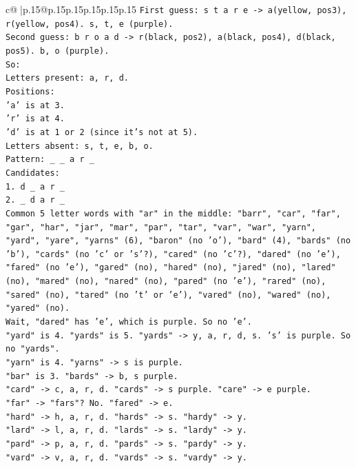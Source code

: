 \documentclass{article}
\begin{document}
{\begin{supertabular}{c@{$\;$}|p{.15\linewidth}@{}p{.15\linewidth}p{.15\linewidth}p{.15\linewidth}p{.15\linewidth}p{.15\linewidth}}
{{{\texttt{First guess: s t a r e {-}> a(yellow, pos3), r(yellow, pos4). s, t, e (purple).} \\
\texttt{Second guess: b r o a d {-}> r(black, pos2), a(black, pos4), d(black, pos5). b, o (purple).} \\
\texttt{So:} \\
\texttt{Letters present: a, r, d.} \\
\texttt{Positions:} \\
\texttt{'a' is at 3.} \\
\texttt{'r' is at 4.} \\
\texttt{'d' is at 1 or 2 (since it's not at 5).} \\
\texttt{Letters absent: s, t, e, b, o.} \\
\texttt{Pattern: \_ \_ a r \_} \\
\texttt{Candidates:} \\
\texttt{1. d \_ a r \_} \\
\texttt{2. \_ d a r \_} \\
\texttt{Common 5 letter words with "ar" in the middle: "barr", "car", "far", "gar", "har", "jar", "mar", "par", "tar", "var", "war", "yarn", "yard", "yare", "yarns" (6), "baron" (no 'o'), "bard" (4), "bards" (no 'b'), "cards" (no 'c' or 's'?), "cared" (no 'c'?), "dared" (no 'e'), "fared" (no 'e'), "gared" (no), "hared" (no), "jared" (no), "lared" (no), "mared" (no), "nared" (no), "pared" (no 'e'), "rared" (no), "sared" (no), "tared" (no 't' or 'e'), "vared" (no), "wared" (no), "yared" (no).} \\
\texttt{Wait, "dared" has 'e', which is purple. So no 'e'.} \\
\texttt{"yard" is 4. "yards" is 5. "yards" {-}> y, a, r, d, s. 's' is purple. So no "yards".} \\
\texttt{"yarn" is 4. "yarns" {-}> s is purple.} \\
\texttt{"bar" is 3. "bards" {-}> b, s purple.} \\
\texttt{"card" {-}> c, a, r, d. "cards" {-}> s purple. "care" {-}> e purple.} \\
\texttt{"far" {-}> "fars"? No. "fared" {-}> e.} \\
\texttt{"hard" {-}> h, a, r, d. "hards" {-}> s. "hardy" {-}> y.} \\
\texttt{"lard" {-}> l, a, r, d. "lards" {-}> s. "lardy" {-}> y.} \\
\texttt{"pard" {-}> p, a, r, d. "pards" {-}> s. "pardy" {-}> y.} \\
\texttt{"vard" {-}> v, a, r, d. "vards" {-}> s. "vardy" {-}> y.} \\
}}}
\end{supertabular}}
\end{document}
